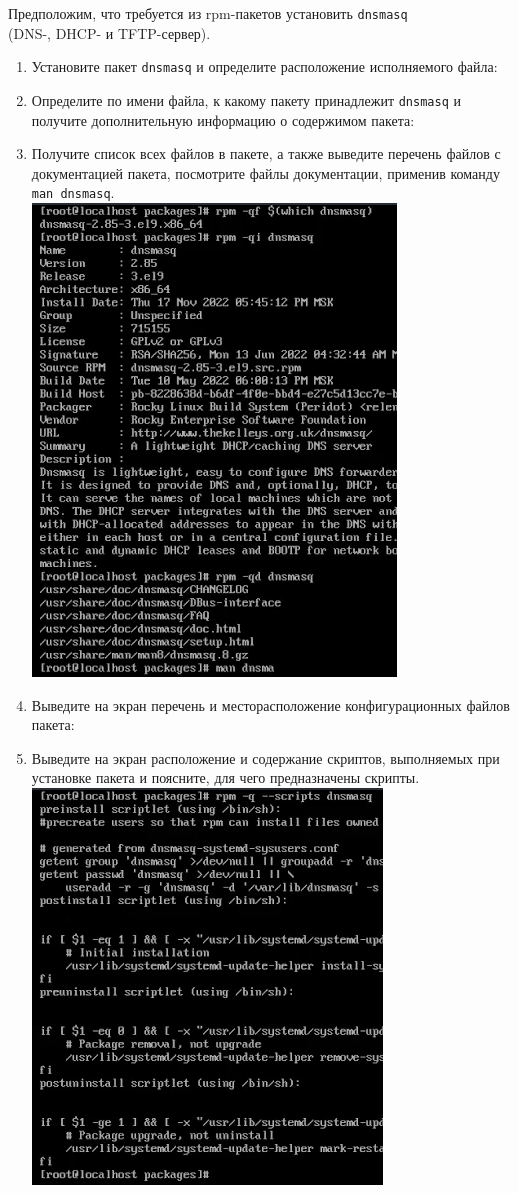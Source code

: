 \documentclass[12pt]{article}
\begin{document}
Предположим, что требуется из rpm-пакетов установить \texttt{dnsmasq}\\ (DNS-, DHCP- и TFTP-сервер).
\begin{enumerate}
	\item Установите пакет \texttt{dnsmasq} и определите расположение исполняемого файла:
	\item Определите по имени файла, к какому пакету принадлежит \texttt{dnsmasq} и получите дополнительную информацию о содержимом пакета:
	\item Получите список всех файлов в пакете, а также выведите перечень файлов с документацией пакета, посмотрите файлы документации, применив команду \texttt{man dnsmasq}.
	      \\\includegraphics{13.png}
	\item Выведите на экран перечень и месторасположение конфигурационных файлов пакета:
	\item Выведите на экран расположение и содержание скриптов, выполняемых при установке пакета и поясните, для чего предназначены скрипты.
	      \\\includegraphics{14.png}

\end{enumerate}
\end{document}
